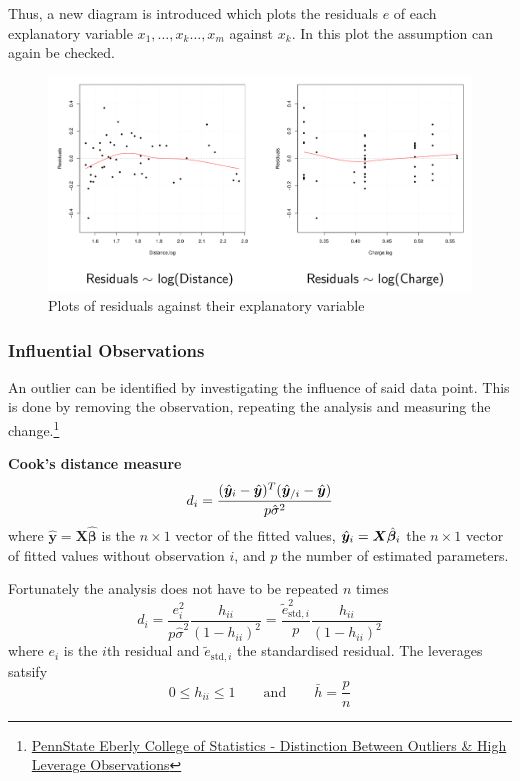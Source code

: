 \documentclass[11pt]{article}
\theoremstyle{definition}
\begin{document}
Thus, a new diagram is introduced which plots the residuals $e$ of each explanatory variable $x_1,\dots,x_k\dots,x_m$ against $x_k$. In this plot the assumption can again be checked.
\begin{figure}[H]
	\centering
	\includegraphics[width=0.7\linewidth]{img/diagnostic_plots_residuals_explanatory}
	\caption{Plots of residuals against their explanatory variable}
	\label{fig:diagnosticplotsresidualsexplanatory}
\end{figure}

\subsubsection{Influential Observations}
An outlier can be identified by investigating the influence of said data point. This is done by removing the observation, repeating the analysis and measuring the change.\footnote{\href{https://online.stat.psu.edu/stat501/lesson/11/11.1}{PennState Eberly College of Statistics - Distinction Between Outliers \& High Leverage Observations}}

\vspace{1em}
\noindent
\textbf{Cook's distance measure}
\begin{equation*}
	d_i  = \frac{(\hat{\bm{y}}_{\\i} - \hat{\bm{y}})^T(\hat{\bm{y}}_{/i} - \hat{\bm{y}})}{p\hat{\sigma}^2}
\end{equation*}
where $\hat{\bm{y}}=\bm{X}\hat{\bm{\beta}}$ is the $n\times1$ vector of the fitted values, $\hat{\bm{y}}_{\\i}=\bm{X}\hat{\bm{\beta}}_{\\i}$ the $n\times1$ vector of fitted values without observation $i$, and $p$ the number of estimated parameters.

Fortunately the analysis does not have to be repeated $n$ times
\begin{equation*}
	d_i = \frac{e_i^2}{p\hat{\sigma}^2}\frac{h_{ii}}{(1-h_{ii})^2} = \frac{\tilde{e}_{\text{std}, i}^2}{p}\frac{h_{ii}}{(1-h_{ii})^2}
\end{equation*}
where $e_i$ is the $i$th residual and $\tilde{e}_{\text{std},i}$ the standardised residual. The leverages satsify
\begin{equation*}
	0\leq h_{ii}\leq 1\qquad\text{and}\qquad \bar{h} = \frac{p}{n}
\end{equation*}
\end{document}
